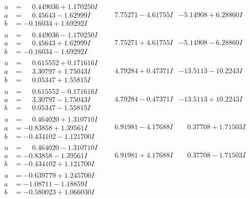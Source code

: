 \documentclass[1p]{elsarticle_modified}
\theoremstyle{definition}
\begin{document}
$$\begin{array}{c|c|c}
\begin{aligned}
u &= \phantom{-}0.449036 + 1.170250 I \\
a &= \phantom{-}0.45643 - 1.62999 I \\
b &= -0.16034 + 1.69292 I\end{aligned}
 & \phantom{-}7.75271 - 4.61755 I & -5.14908 + 6.28860 I \\ \hline\begin{aligned}
u &= \phantom{-}0.449036 - 1.170250 I \\
a &= \phantom{-}0.45643 + 1.62999 I \\
b &= -0.16034 - 1.69292 I\end{aligned}
 & \phantom{-}7.75271 + 4.61755 I & -5.14908 - 6.28860 I \\ \hline\begin{aligned}
u &= \phantom{-}0.615552 + 0.171616 I \\
a &= \phantom{-}3.30797 + 1.75043 I \\
b &= \phantom{-}0.05347 + 1.55815 I\end{aligned}
 & \phantom{-}4.79284 + 0.47371 I & -13.5113 - 10.2243 I \\ \hline\begin{aligned}
u &= \phantom{-}0.615552 - 0.171616 I \\
a &= \phantom{-}3.30797 - 1.75043 I \\
b &= \phantom{-}0.05347 - 1.55815 I\end{aligned}
 & \phantom{-}4.79284 - 0.47371 I & -13.5113 + 10.2243 I \\ \hline\begin{aligned}
u &= \phantom{-}0.464020 + 1.310710 I \\
a &= -0.83858 + 1.39561 I \\
b &= -0.434102 - 1.121700 I\end{aligned}
 & \phantom{-}6.91981 - 4.17688 I & \phantom{-}0.37708 + 1.71503 I \\ \hline\begin{aligned}
u &= \phantom{-}0.464020 - 1.310710 I \\
a &= -0.83858 - 1.39561 I \\
b &= -0.434102 + 1.121700 I\end{aligned}
 & \phantom{-}6.91981 + 4.17688 I & \phantom{-}0.37708 - 1.71503 I \\ \hline\begin{aligned}
u &= -0.639779 + 1.245700 I \\
a &= -1.08711 - 1.18859 I \\
b &= -0.580023 + 1.066030 I\end{aligned}

\end{array}$$
\end{document}

